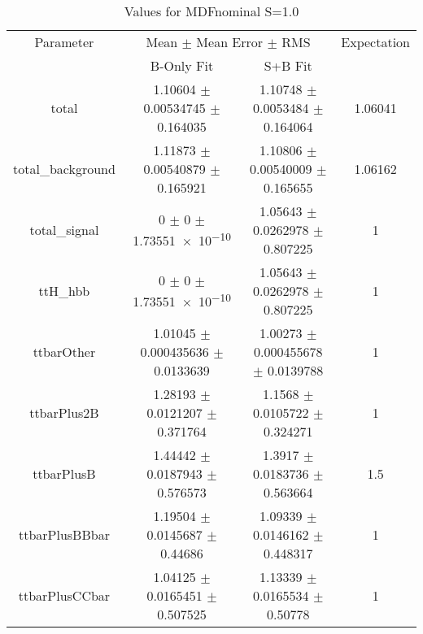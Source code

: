 \begin{table}
\centering
\caption{Values for MDFnominal S=1.0}
\begin{tabular}{cccc}
\toprule
Parameter & \multicolumn{2}{c}{Mean $\pm$ Mean Error $\pm$ RMS} & Expectation\\
 & B-Only Fit & S+B Fit & \\
\midrule
total & \num{1.10604} $\pm$ \num{0.00534745} $\pm$ \num{0.164035} & \num{1.10748} $\pm$ \num{0.0053484} $\pm$ \num{0.164064} & \num{1.06041}\\
total\_background & \num{1.11873} $\pm$ \num{0.00540879} $\pm$ \num{0.165921} & \num{1.10806} $\pm$ \num{0.00540009} $\pm$ \num{0.165655} & \num{1.06162}\\
total\_signal & \num{0} $\pm$ \num{0} $\pm$ \num{1.73551e-10} & \num{1.05643} $\pm$ \num{0.0262978} $\pm$ \num{0.807225} & \num{1}\\
ttH\_hbb & \num{0} $\pm$ \num{0} $\pm$ \num{1.73551e-10} & \num{1.05643} $\pm$ \num{0.0262978} $\pm$ \num{0.807225} & \num{1}\\
ttbarOther & \num{1.01045} $\pm$ \num{0.000435636} $\pm$ \num{0.0133639} & \num{1.00273} $\pm$ \num{0.000455678} $\pm$ \num{0.0139788} & \num{1}\\
ttbarPlus2B & \num{1.28193} $\pm$ \num{0.0121207} $\pm$ \num{0.371764} & \num{1.1568} $\pm$ \num{0.0105722} $\pm$ \num{0.324271} & \num{1}\\
ttbarPlusB & \num{1.44442} $\pm$ \num{0.0187943} $\pm$ \num{0.576573} & \num{1.3917} $\pm$ \num{0.0183736} $\pm$ \num{0.563664} & \num{1.5}\\
ttbarPlusBBbar & \num{1.19504} $\pm$ \num{0.0145687} $\pm$ \num{0.44686} & \num{1.09339} $\pm$ \num{0.0146162} $\pm$ \num{0.448317} & \num{1}\\
ttbarPlusCCbar & \num{1.04125} $\pm$ \num{0.0165451} $\pm$ \num{0.507525} & \num{1.13339} $\pm$ \num{0.0165534} $\pm$ \num{0.50778} & \num{1}\\
\bottomrule
\end{tabular}
\end{table}